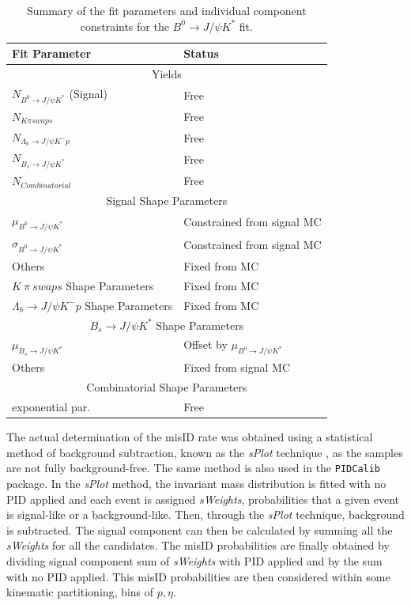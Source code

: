 \begin{table}[H]
\centering
\begin{tabular}{ l  l }\toprule
Fit Parameter & Status  \\ \hline
	\multicolumn{2}{c}{Yields} \\ \hline
$N_{B^{0} \rightarrow J/\psi K^{*}}$ (Signal)  &  Free \\
$N_{K \pi swaps}$ & Free\\
$N_{\Lambda_{b} \rightarrow J/\psi K^{-} p}$ & Free\\
$N_{B_{s} \rightarrow J/\psi K^{*}}$ & Free \\
$N_{Combinatorial}$ & Free\\
\hline
	\multicolumn{2}{c}{Signal Shape Parameters} \\
\hline
$\mu_{B^{0} \rightarrow J/\psi K^{*}}$ & Constrained from signal MC\\
$\sigma_{B^{0} \rightarrow J/\psi K^{*}}$ & Constrained from signal MC\\
Others & Fixed from MC\\
\hline
$K\ \pi\ swaps$ Shape Parameters & Fixed from MC \\
\hline
$\Lambda_{b} \rightarrow J/\psi K^{-} p$ Shape Parameters & Fixed from MC \\
\hline
	\multicolumn{2}{c}{${B_{s} \rightarrow J/\psi K^{*}}$ Shape Parameters} \\\hline
$\mu_{B_{s} \rightarrow J/\psi K^{*}}$ & Offset by $\mu_{B^{0} \rightarrow J/\psi K^{*}}$ \\
Others & Fixed from signal MC \\
\hline
	\multicolumn{2}{c}{Combinatorial Shape Parameters}  \\
\hline
exponential par.  & Free\\
\bottomrule
\end{tabular}
\caption{Summary of the fit parameters and individual component constraints for the $B^{0} \rightarrow J/\psi K^{*}$ fit.}
\label{tab:floatingparsummarylol}
\end{table}






The actual determination of the misID rate was obtained using a statistical method of background subtraction, known as the \textit{sPlot} technique \cite{sPlot}, as the samples are not fully background-free. The same method is also used in the \texttt{PIDCalib} package. In the \textit{sPlot} method, the invariant mass distribution is fitted with no \gls{PID} applied and each event is assigned \textit{sWeights}, probabilities that a given event is signal-like or a background-like. Then, through the \textit{sPlot} technique, background is subtracted. The signal component can then be calculated by summing all the \textit{sWeights} for all the candidates. The misID probabilities are finally obtained by dividing signal component sum of \textit{sWeights} with \gls{PID} applied and by the sum with no \gls{PID} applied. This misID probabilities are then considered within some kinematic partitioning, bins of $p,\eta$. 

